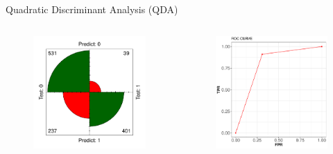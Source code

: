 \documentclass{beamer}
\begin{document}
\begin{frame}{Quadratic Discriminant Analysis (QDA)}
\begin{columns}
  \begin{figure}[b]{\textwidth}
    \includegraphics[width=\textwidth]{Pic/QDA_confusion.pdf}
  \end{figure} 
  \begin{figure}[b]{\textwidth}
    \includegraphics[width=\textwidth]{Pic/ROC_QDA.pdf}
  \end{figure}
\end{columns}
\end{frame}
\end{document}
